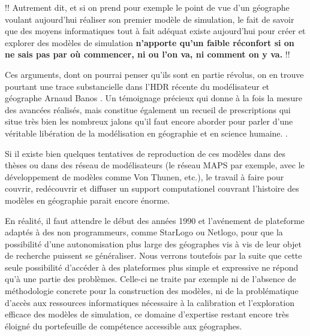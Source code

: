 
!!
	Autrement dit, et si on prend pour exemple le point de vue d'un géographe voulant aujourd'hui réaliser son premier modèle de simulation, le fait de savoir que des moyens informatiques tout à fait adéquat existe aujourd'hui pour créer et explorer des modèles de simulation \textbf{n'apporte qu'un faible réconfort si on ne sais pas par où commencer, ni ou l'on va, ni comment on y va.}
!!

Ces arguments, dont on pourrai penser qu'ils sont en partie révolus, on en trouve pourtant une trace substancielle dans l'HDR récente du modélisateur et géographe Arnaud Banos \autocite{Banos2013}. Un témoignage précieux qui donne à la fois la mesure des avancées réalisés, mais constitue également un recueil de prescriptions qui situe très bien les nombreux jalons qu'il faut encore aborder pour parler d'une véritable libération de la modélisation en géographie et en science humaine. \autocite{Banos2013}.

Si il existe bien quelques tentatives de reproduction de ces modèles dans des thèses ou dans des réseau de modélisateurs (le réseau MAPS par exemple, avec le développement de modèles comme Von Thunen, etc.), le travail à faire pour couvrir, redécouvrir et diffuser un support computationel couvrant l'histoire des modèles en géographie parait encore énorme.

En réalité, il faut attendre le début des années 1990 et l'avénement de plateforme adaptés à des non programmeurs, comme StarLogo ou Netlogo, pour que la possibilité d'une autonomisation plus large des géographes vis à vis de leur objet de recherche puissent se généraliser. Nous verrons toutefois par la suite que cette seule possibilité d'accéder à des plateformes plus simple et expressive ne répond qu'à une partie des problèmes. Celle-ci ne traite par exemple ni de l'absence de méthodologie concrete pour la construction des modèles, ni de la problématique d'accès aux ressources informatiques nécessaire à la calibration et l'exploration efficace des modèles de simulation, ce domaine d'expertise restant encore très éloigné du portefeuille de compétence accessible aux géographes.

